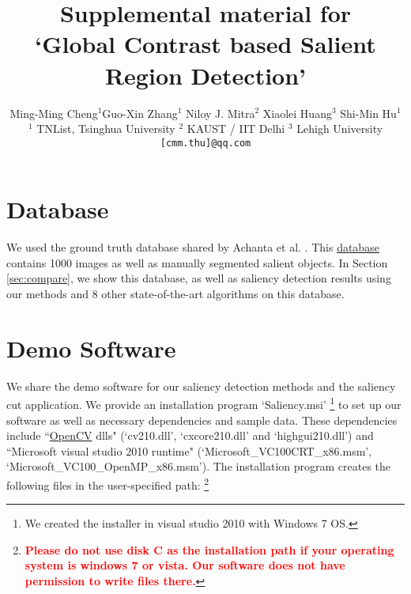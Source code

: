 \documentclass[10pt,twocolumn,letterpaper]{article}
\newcommand{\secref}[1]{Section \ref{#1}}
\begin{document}
\title{Supplemental material for \\ `Global Contrast based Salient Region Detection'}


\author{Ming-Ming Cheng$^{1}$\quad Guo-Xin Zhang$^{1}$ \quad Niloy J. Mitra$^{2}$
    \quad Xiaolei Huang$^{3}$  \quad Shi-Min Hu$^{1}$  \\
    $^{1}$ TNList, Tsinghua University \quad \quad
    $^2$ KAUST / IIT Delhi  \quad \quad $^3$ Lehigh University\\
    {\tt \small [cmm.thu]@qq.com}
}

\maketitle



\section{Database}\label{sec:data}

We used the ground truth database shared by Achanta et al. \cite{09cvpr/Achanta_FTSaliency}.
This \href{http://ivrg.epfl.ch/supplementary_material/RK_CVPR09/index.html}{database} contains
1000 images as well as manually segmented salient objects. In \secref{sec:compare}, we show this database, as well
as saliency detection results using our methods and 8 other state-of-the-art algorithms on this database.


\section{Demo Software}\label{sec:software}

We share the demo software for our saliency detection methods and the saliency cut
application. We provide an installation program `Saliency.msi' \footnote{We created the installer in visual studio 2010 with Windows 7 OS.} to set up our software
as well as necessary dependencies and sample data. These dependencies include ``\href{http://opencv.willowgarage.com/wiki/}{OpenCV} dlls" (`cv210.dll',
`cxcore210.dll' and `highgui210.dll') and ``Microsoft visual studio 2010 runtime"
(`Microsoft\_VC100CRT\_x86.msm', `Microsoft\_VC100\_OpenMP\_x86.msm'). The
installation program creates the following files in the user-specified path: \footnote{\textcolor{red}
{\bf Please do not use disk C as the installation path if your operating system is windows 7 or vista. Our software does not have permission to write files there.}} %
\end{document}
